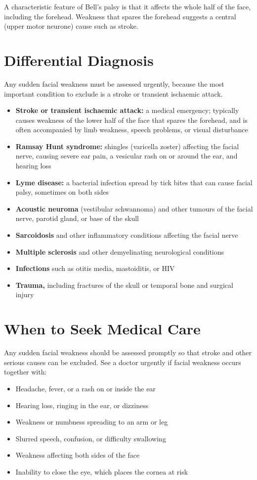A characteristic feature of Bell's palsy is that it affects the whole half of the face, including the forehead. Weakness that spares the forehead suggests a central (upper motor neurone) cause such as stroke.

\section*{Differential Diagnosis}
Any sudden facial weakness must be assessed urgently, because the most important condition to exclude is a stroke or transient ischaemic attack.

\begin{itemize}
    \item \textbf{Stroke or transient ischaemic attack:} a medical emergency; typically causes weakness of the lower half of the face that spares the forehead, and is often accompanied by limb weakness, speech problems, or visual disturbance
    \item \textbf{Ramsay Hunt syndrome:} shingles (varicella zoster) affecting the facial nerve, causing severe ear pain, a vesicular rash on or around the ear, and hearing loss
    \item \textbf{Lyme disease:} a bacterial infection spread by tick bites that can cause facial palsy, sometimes on both sides
    \item \textbf{Acoustic neuroma} (vestibular schwannoma) and other tumours of the facial nerve, parotid gland, or base of the skull
    \item \textbf{Sarcoidosis} and other inflammatory conditions affecting the facial nerve
    \item \textbf{Multiple sclerosis} and other demyelinating neurological conditions
    \item \textbf{Infections} such as otitis media, mastoiditis, or HIV
    \item \textbf{Trauma,} including fractures of the skull or temporal bone and surgical injury
\end{itemize}

\section*{When to Seek Medical Care}
Any sudden facial weakness should be assessed promptly so that stroke and other serious causes can be excluded. See a doctor urgently if facial weakness occurs together with:

\begin{itemize}
    \item Headache, fever, or a rash on or inside the ear
    \item Hearing loss, ringing in the ear, or dizziness
    \item Weakness or numbness spreading to an arm or leg
    \item Slurred speech, confusion, or difficulty swallowing
    \item Weakness affecting both sides of the face
    \item Inability to close the eye, which places the cornea at risk
\end{itemize}

